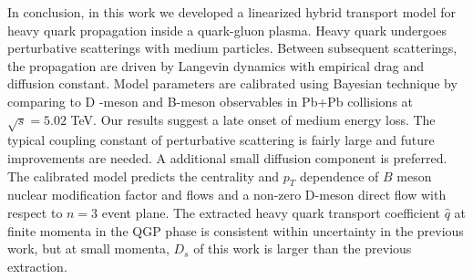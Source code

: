 \documentclass[aps, prc, reprint, amsmath, groupedaddress, nofootinbib]{revtex4-1}
\begin{document}
In conclusion, in this work we developed a linearized hybrid transport model for heavy quark propagation inside a quark-gluon plasma.
Heavy quark undergoes perturbative scatterings with medium particles. Between subsequent scatterings, the propagation are driven by Langevin dynamics with empirical drag and diffusion constant.
Model parameters are calibrated using Bayesian technique by comparing to D -meson and B-meson observables in Pb+Pb collisions at $\sqrt{s}=5.02$ TeV.
Our results suggest a late onset of medium energy loss.
The typical coupling constant of perturbative scattering is fairly large and future improvements are needed.
A additional small diffusion component is preferred.
The calibrated model predicts the centrality and $p_T$ dependence of $B$ meson nuclear modification factor and flows and a non-zero D-meson direct flow with respect to $n=3$ event plane.
The extracted heavy quark transport coefficient $\hat{q}$ at finite momenta in the QGP phase is consistent within uncertainty in the previous work, but at small momenta, $D_s$ of this work is larger than the previous extraction.
\end{document}
